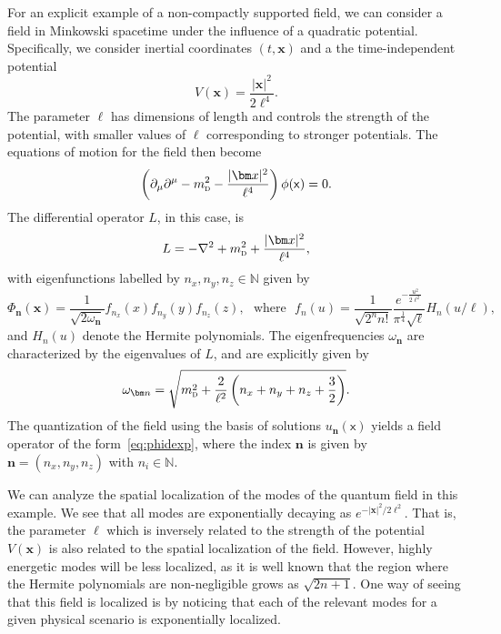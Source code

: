 \documentclass[letterpaper,12pt,titlepage,oneside,final]{book}
\newcommand{\mf}{\mathsf}%
\newcommand{\tc}[1]{\textsc{#1}}
\begin{document}
For an explicit example of a non-compactly supported field, we can consider a field in Minkowski spacetime under the influence of a quadratic potential. Specifically, we consider inertial coordinates $(t,\bm x)$ and a the time-independent potential
\begin{equation}
    V(\bm x) = \frac{|\bm x|^2}{2\ell^4}.
\end{equation}
The parameter $\ell$ has dimensions of length and controls the strength of the potential, with smaller values of $\ell$ corresponding to stronger potentials. The equations of motion for the field then become
\begin{equation}
    \left(\partial_\mu \partial^\mu - m_\tc{d}^2 - \frac{|\bm x|^2}{\ell^4}\right) \phi(\mf x) = 0.
\end{equation}
The differential operator $L$, in this case, is
\begin{equation}\label{eq:Lgen}
    L = - \nabla^2 + m_{\tc{d}}^2 + \frac{|\bm x|^2}{\ell^4},
\end{equation}
with eigenfunctions labelled by $n_x,n_y,n_z\in \mathbb{N}$ given by
\begin{equation}
    \Phi_{\bm n}(\bm x) = \frac{1}{\sqrt{2\omega_{\bm n}}}f_{n_x}(x)f_{n_y}(y)f_{n_z}(z), \,\,\text{ where }\,\, f_n(u) = \frac{1}{\sqrt{2^n n!}}\frac{e^{-\frac{u^2}{2\ell^2}}}{\pi^\frac{1}{4} \sqrt{\ell}}H_n(u/\ell),
\end{equation}
and $H_n(u)$ denote the Hermite polynomials. The eigenfrequencies $\omega_{\bm n}$ are characterized by the eigenvalues of $L$, and are explicitly given by
\begin{equation}\label{eq:gapHO}
    \omega_{\bm n} = \sqrt{m_\tc{d}^2+ \frac{2}{\ell^2}\left(n_x + n_y + n_z +\frac{3}{2}\right)}.
\end{equation}
The quantization of the field using the basis of solutions $u_{\bm n}(\mf x)$ yields a field operator of the form~\eqref{eq:phidexp}, where the index $\bm n$ is given by $\bm n = (n_x,n_y,n_z)$ with $n_i \in \mathbb{N}$.

We can analyze the spatial localization of the modes of the quantum field in this example. We see that all modes are exponentially decaying as $e^{-|\bm x|^2/2\ell^2}$. That is, the parameter $\ell$ which is inversely related to the strength of the potential $V(\bm x)$ is also related to the spatial localization of the field. However, highly energetic modes will be less localized, as it is well known that the region where the Hermite polynomials are non-negligible grows as $\sqrt{2n + 1}$. One way of seeing that this field is localized is by noticing that each of the relevant modes for a given physical scenario is exponentially localized.
\end{document}
